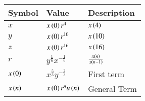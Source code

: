 \begin{tabular}{|m{2cm}|m{2cm}|m{2cm}|}
    \hline
    \textbf{Symbol} & \textbf{Value} & \textbf{Description}\\ [1ex]
    \hline
        $x$ & $x\left(0\right)r^4$ & $x\left(4\right)$ \\ [1ex]
    \hline
        $y$ & $x\left(0\right)r^{10}$ & $x\left(10\right)$\\ [1ex]
    \hline
        $z$ & $x\left(0\right)r^{16}$ & $x\left(16\right)$\\ [1ex]
    \hline
        $r$ & $y^{\frac{1}{6}}x^{-\frac{1}{6}}$ & $\frac{x\left(n\right)}{x\left(n-1\right)}$\\[1ex]
    \hline \vspace{0.1cm}
        $x\left(0\right)$ & $x^{\frac{5}{3}}y^{-\frac{2}{3}}$ & First term \\[1ex]
    \hline
        $x\left(n\right)$ & $x\left(0\right)r^nu\left(n\right)$ & General Term \\ [1ex]
    \hline
\end{tabular}